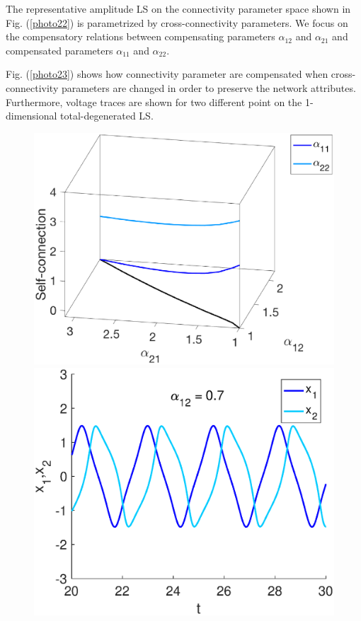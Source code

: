 The representative amplitude LS on the connectivity parameter space shown in Fig. (\ref{photo22}) is parametrized by cross-connectivity parameters. We focus on the compensatory relations between compensating parameters $\alpha_{12}$ and $\alpha_{21}$ and compensated parameters $\alpha_{11}$ and $\alpha_{22}$.

Fig. (\ref{photo23}) shows how connectivity parameter are compensated when cross-connectivity parameters are changed in order to preserve the network attributes. Furthermore, voltage traces are shown for two different point on the 1-dimensional total-degenerated LS.

\begin{figure}[h]
  \begin{minipage}{0.32\linewidth}
  \begin{center}
\includegraphics[width=1\linewidth]{Images/photo23_1.eps}
\end{center}
  \end{minipage} 
  \begin{minipage}{0.32\linewidth}
  \begin{center}
\includegraphics[width=1\linewidth]{Images/photo23_2.eps}
\end{center}


\end{minipage}
\end{figure}
